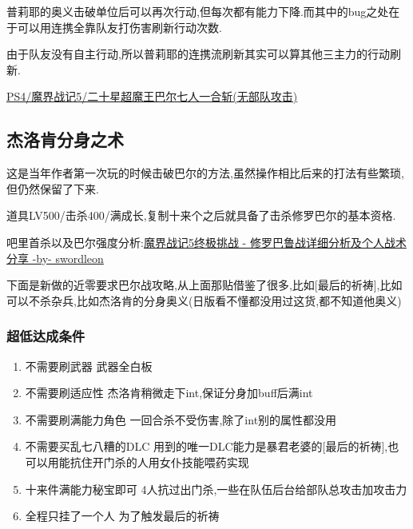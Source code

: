 	普莉耶的奥义击破单位后可以再次行动,但每次都有能力下降.而其中的bug之处在于可以用连携全靠队友打伤害刷新行动次数.

	由于队友没有自主行动,所以普莉耶的连携流刷新其实可以算其他三主力的行动刷新.

	\href{http://www.bilibili.com/video/av3480159/}{ PS4/魔界战记5/二十星超魔王巴尔七人一合斩(无部队攻击)}

	\newpage

	\subsection{杰洛肯分身之术}

	这是当年作者第一次玩的时候击破巴尔的方法,虽然操作相比后来的打法有些繁琐,但仍然保留了下来.

	道具LV500/击杀400/满成长,复制十来个之后就具备了击杀修罗巴尔的基本资格.

	{\color{red}{如果准备了大概200个万灵药做的咖喱可以不需要装备就达到20亿血,简化辅助人员的需求}}

	吧里首杀以及巴尔强度分析:\href{http://tieba.baidu.com/p/3949061316}{魔界战记5终极挑战 - 修罗巴鲁战详细分析及个人战术分享 -by- swordleon }

	下面是新做的近零要求巴尔战攻略,从上面那贴借鉴了很多,比如[最后的祈祷],比如可以不杀杂兵,比如杰洛肯的分身奥义(日版看不懂都没用过这货,都不知道他奥义)

	\subsubsection{超低达成条件}
	\begin{enumerate}
		\item{不需要刷武器}
		武器全白板

		\item{不需要刷适应性}
		杰洛肯稍微走下int,保证分身加buff后满int

		\item{不需要刷满能力角色}
		一回合杀不受伤害,除了int别的属性都没用

		\item{不需要买乱七八糟的DLC}
		用到的唯一DLC能力是暴君老婆的[最后的祈祷],也可以用能抗住开门杀的人用女仆技能喂药实现

		\item{十来件满能力秘宝即可}
		4人抗过出门杀,一些在队伍后台给部队总攻击加攻击力

		\item{全程只挂了一个人}
		为了触发最后的祈祷
	\end{enumerate}

